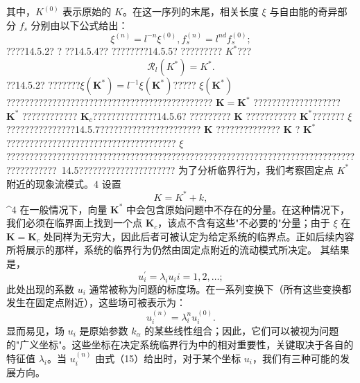 其中，\(K^{(0)}\) 表示原始的 \(K\)。在这一序列的末尾，相关长度 \(\xi\) 与自由能的奇异部分 \(f_{s}\) 分别由以下公式给出：
\begin{equation}\tag{14.3.7}\label{eq:14.3.7}
\xi ^{( n )} = l ^{- n} \xi ^{( 0 )} ,  f _ { s } ^{( n )} = l ^{n d} f _ { s } ^{( 0 )} ;
\end{equation}
????14.5.2? ? ??14.5.4??
????????14.5.5? ????????? \(K^{*}\)???
\begin{equation}\tag{14.3.8}\label{eq:14.3.8}
\mathcal { R } _ { l } ( K ^{*} ) = K ^{*} .
\end{equation}
??14.5.2? ???????\(\xi(\boldsymbol{K}^{*})=l^{-1}\xi(\boldsymbol{K}^{*})\)????? \(\xi(\boldsymbol{K}^{*})\) ????????????????????????????????????????????? \(\boldsymbol{K}=\boldsymbol{K}^{*}\) ??????????????????? \(\boldsymbol{K}^{*}\) ???????????? \(\boldsymbol{K}_{c}\)??????????????14.5.6? ????????? \(\boldsymbol{K}\) ??????????? \(\boldsymbol{K}^{*}\)??????? \(\xi\) ???????????????14.5.7?????????????????????? \(\boldsymbol{K}\) ?????????????? \(\boldsymbol{K}\) ? \(\boldsymbol{K}^{*}\) ????????????????????????????????????? \(\xi\) ???????????????????????????????????????????????????????????????????????????????????????~14.5?????????????????????
为了分析临界行为，我们考察固定点 \(K^{*}\) 附近的现象流模式。4 设置
\begin{equation}\tag{14.3.9}\label{eq:14.3.9}
K = K ^{*} + k ,
\end{equation}
\^{}4 在一般情况下，向量 \(\boldsymbol{K}^{*}\) 中会包含原始问题中不存在的分量。在这种情况下，我们必须在临界面上找到一个点 \(\boldsymbol{K}_{c}\)，该点不含有这些"不必要的"分量；由于 \(\xi\) 在 \(\boldsymbol{K}=\boldsymbol{K}_{c}\) 处同样为无穷大，因此后者可被认定为给定系统的临界点。正如后续内容所将展示的那样，系统的临界行为仍然由固定点附近的流动模式所决定。
其结果是，
\begin{equation}\tag{14.3.10}\label{eq:14.3.10}
u _ { i } ^{\prime} = \lambda _ { i } u _ { i }  i = 1 , 2 , \ldots ;
\end{equation}
此处出现的系数 \(u_{i}\) 通常被称为问题的标度场。在一系列变换下（所有这些变换都发生在固定点附近），这些场可被表示为：
\begin{equation}\tag{14.3.11}\label{eq:14.3.11}
u _ { i } ^{( n )} = \lambda _ { i } ^{n} u _ { i } ^{( 0 )} .
\end{equation}
显而易见，场 \(u_{i}\) 是原始参数 \(k_{\alpha}\) 的某些线性组合；因此，它们可以被视为问题的"广义坐标"。这些坐标在决定系统临界行为中的相对重要性，关键取决于各自的特征值 \(\lambda_{i}\)。当 \(u_{i}^{(n)}\) 由式（15）给出时，对于某个坐标 \(u_{i}\)，我们有三种可能的发展方向。
